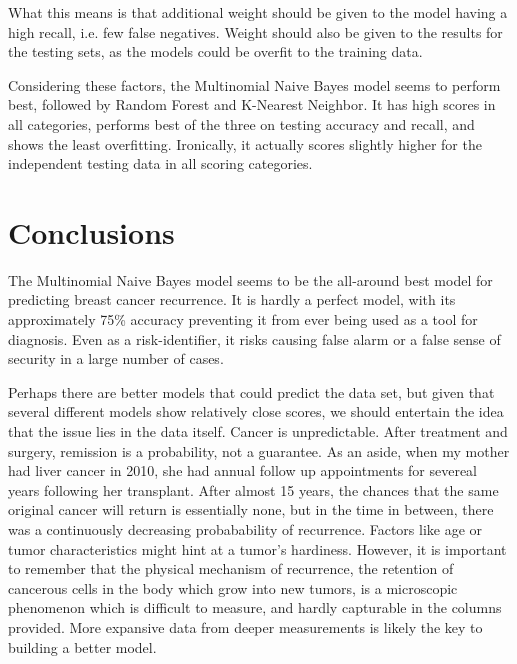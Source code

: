 \documentclass{article}
\begin{document}
What this means is that additional weight should be given to the model having a high recall, i.e. few false negatives. Weight should also be given to the results for the testing sets, as the models could be overfit to the training data.

Considering these factors, the Multinomial Naive Bayes model seems to perform best, followed by Random Forest and K-Nearest Neighbor. It has high scores in all categories, performs best of the three on testing accuracy and recall, and shows the least overfitting. Ironically, it actually scores slightly higher for the independent testing data in all scoring categories.

\section{Conclusions}

The Multinomial Naive Bayes model seems to be the all-around best model for predicting breast cancer recurrence. It is hardly a perfect model, with its approximately 75\% accuracy preventing it from ever being used as a tool for diagnosis. Even as a risk-identifier, it risks causing false alarm or a false sense of security in a large number of cases.

Perhaps there are better models that could predict the data set, but given that several different models show relatively close scores, we should entertain the idea that the issue lies in the data itself. Cancer is unpredictable. After treatment and surgery, remission is a probability, not a guarantee. As an aside, when my mother had liver cancer in 2010, she had annual follow up appointments for severeal years following her transplant. After almost 15 years, the chances that the same original cancer will return is essentially none, but in the time in between, there was a continuously decreasing probabability of recurrence. Factors like age or tumor characteristics might hint at a tumor's hardiness. However, it is important to remember that the physical mechanism of recurrence, the retention of cancerous cells in the body which grow into new tumors, is a microscopic phenomenon which is difficult to measure, and hardly capturable in the columns provided. More expansive data from deeper measurements is likely the key to building a better model.
\end{document}
